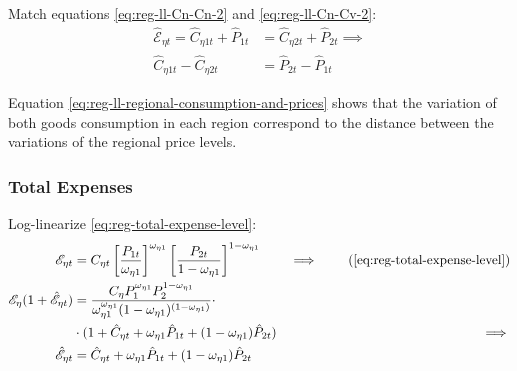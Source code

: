 \documentclass[../thesis.tex]{subfiles}
\begin{document}
Match equations \ref{eq:reg-ll-Cn-Cn-2} and \ref{eq:reg-ll-Cn-Cv-2}:
\begin{align}
	\hat{\mathscr{E}}_{\eta t} = \hat{C}_{\eta 1 t} + \hat{P}_{1 t} &= \hat{C}_{\eta 2 t} + \hat{P}_{2 t} \implies \nonumber \\
	\hat{C}_{\eta 1 t} - \hat{C}_{\eta 2 t} &= \hat{P}_{2 t} - \hat{P}_{1 t} \label{eq:reg-ll-regional-consumption-and-prices}
\end{align}

Equation \ref{eq:reg-ll-regional-consumption-and-prices} shows that the variation of both goods consumption in each region correspond to the distance between the variations of the regional price  levels.



\subsubsection*{Total Expenses}

Log-linearize \ref{eq:reg-total-expense-level}:
	\begin{alignat}{2}
		\te &= C_{\eta t} \left[ \frac{P_{1 t}}{\omega_{\eta 1}} \right]^{\omega_{\eta 1}} \left[ \frac{P_{2 t}}{1 -\omega_{\eta 1}} \right]^{1 -\omega_{\eta 1}} &\implies \tag{\ref{eq:reg-total-expense-level}} \\
		\te[] (1 + \hat{\mathscr{E}}_{\eta t}) &= \frac{C_{\eta} P_{1}^{\omega_{\eta 1}} P_{2}^{1 -\omega_{\eta 1}}}{\omega_{\eta 1}^{\omega_{\eta 1}} (1 - \omega_{\eta 1})^{(1 - \omega_{\eta 1})}} \cdot \nonumber \\
		 \qquad &\cdot (1 + \hat{C}_{\eta t} + \omega_{\eta 1} \hat{P}_{1 t} + (1 -\omega_{\eta 1}) \hat{P}_{2 t}) &\implies \nonumber \\
		\hat{\mathscr{E}}_{\eta t} &= \hat{C}_{\eta t} + \omega_{\eta 1} \hat{P}_{1 t} + (1 -\omega_{\eta 1}) \hat{P}_{2 t} \label{eq:reg-ll-total-expense-level}
	\end{alignat}

\end{document}
